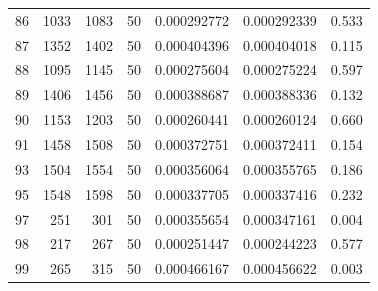\begin{tabular}{r r r r r r r}
86 & 1033 & 1083 & 50 & 0.000292772 & 0.000292339 & 0.533 \\
87 & 1352 & 1402 & 50 & 0.000404396 & 0.000404018 & 0.115 \\
88 & 1095 & 1145 & 50 & 0.000275604 & 0.000275224 & 0.597 \\
89 & 1406 & 1456 & 50 & 0.000388687 & 0.000388336 & 0.132 \\
90 & 1153 & 1203 & 50 & 0.000260441 & 0.000260124 & 0.660 \\
91 & 1458 & 1508 & 50 & 0.000372751 & 0.000372411 & 0.154 \\
93 & 1504 & 1554 & 50 & 0.000356064 & 0.000355765 & 0.186 \\
95 & 1548 & 1598 & 50 & 0.000337705 & 0.000337416 & 0.232 \\
97 & 251 & 301 & 50 & 0.000355654 & 0.000347161 & 0.004 \\
98 & 217 & 267 & 50 & 0.000251447 & 0.000244223 & 0.577 \\
99 & 265 & 315 & 50 & 0.000466167 & 0.000456622 & 0.003 \\
\bottomrule
\end{tabular}
